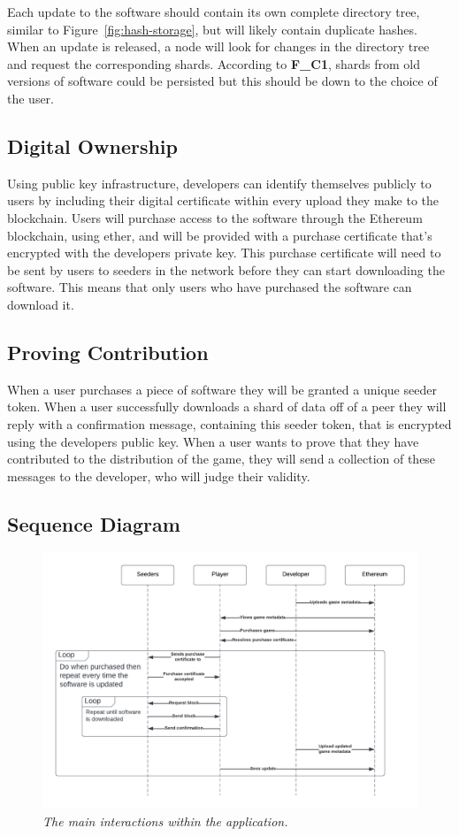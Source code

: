\noindent Each update to the software should contain its own complete directory tree, similar to Figure~\ref{fig:hash-storage}, but will likely contain duplicate hashes. When an update is released, a node will look for changes in the directory tree and request the corresponding shards. According to \textbf{F\_C1}, shards from old versions of software could be persisted but this should be down to the choice of the user.

\subsection*{Digital Ownership}

Using public key infrastructure, developers can identify themselves publicly to users by including their digital certificate within every upload they make to the blockchain. Users will purchase access to the software through the Ethereum blockchain, using ether, and will be provided with a purchase certificate that's encrypted with the developers private key.
\x
This purchase certificate will need to be sent by users to seeders in the network before they can start downloading the software. This means that only users who have purchased the software can download it. 

\subsection*{Proving Contribution}

When a user purchases a piece of software they will be granted a unique seeder token. When a user successfully downloads a shard of data off of a peer they will reply with a confirmation message, containing this seeder token, that is encrypted using the developers public key. When a user wants to prove that they have contributed to the distribution of the game, they will send a collection of these messages to the developer, who will judge their validity.

\subsection*{Sequence Diagram}

\begin{figure}[ht]
  \centering
  \includegraphics[width=.95\textwidth]{images/diagrams/seqeunce-diagram.png}
  \caption{\textit{The main interactions within the application.}}
\end{figure}